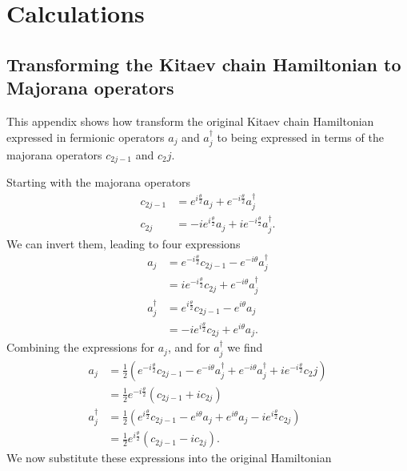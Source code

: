 \chapter{Calculations}
\section{Transforming the Kitaev chain Hamiltonian to Majorana operators} 
\label{Appendix:Hamiltonian_Transformation_Majorana_ops}
This appendix shows how transform the original Kitaev chain Hamiltonian expressed in fermionic operators $a_j$ and $a_j^\dagger$ to being expressed in terms of the majorana operators $c_{2j-1}$ and $c_2j$. 

Starting with the majorana operators
\begin{align}
    c_{2j-1} &= e^{i \frac{\theta}{2}} a_j + e^{-i \frac{\theta}{2}}a_j^\dagger \\
    c_{2j} &= -ie^{i \frac{\theta}{2}} a_j + ie^{-i \frac{\theta}{2}}a_j^\dagger.
\end{align}
We can invert them, leading to four expressions
\begin{align}
    a_j &= e^{- i \frac{\theta}{2}} c_{2j-1} - e^{-i \theta} a_j^\dagger \\
    &= i e^{- i \frac{\theta}{2}} c_{2j} + e^{- i \theta} a_j^\dagger \\
    a_j^\dagger &= e^{i \frac{\theta}{2}} c_{2j-1} - e^{i\theta} a_j \\
    &= - i e^{i\frac{\theta}{2}} c_{2j} + e^{i \theta} a_j.
\end{align}
Combining the expressions for $a_j$, and for $a_j^\dagger$ we find
\begin{align}
    a_j &= \frac{1}{2} \left( e^{- i \frac{\theta}{2}} c_{2j-1} - e^{- i \theta} a_j^\dagger + e^{- i \theta} a_j^\dagger + i e^{- i \frac{\theta}{2}} c_2j \right) \\
    &= \frac{1}{2} e^{-i \frac{\theta}{2}} \left( c_{2j-1} + i c_{2j} \right)\\
    a_j^\dagger &= \frac{1}{2} \left( e^{i \frac{\theta}{2}} c_{2j-1} - e^{i\theta} a_j + e^{i \theta} a_j - i e^{i\frac{\theta}{2}} c_{2j}   \right) \\
    &= \frac{1}{2} e^{i \frac{\theta}{2}} \left( c_{2j-1} - i c_{2j}  \right).
\end{align}
We now substitute these expressions into the original Hamiltonian
